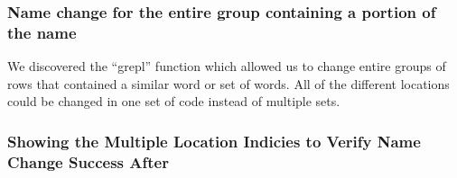 \documentclass[
]{article}
\newenvironment{Shaded}{\begin{snugshade}}{\end{snugshade}}
\newcommand{\CommentTok}[1]{\textcolor[rgb]{0.56,0.35,0.01}{\textit{#1}}}
\newcommand{\KeywordTok}[1]{\textcolor[rgb]{0.13,0.29,0.53}{\textbf{#1}}}
\newcommand{\NormalTok}[1]{#1}
\newcommand{\OperatorTok}[1]{\textcolor[rgb]{0.81,0.36,0.00}{\textbf{#1}}}
\newcommand{\StringTok}[1]{\textcolor[rgb]{0.31,0.60,0.02}{#1}}
\begin{document}
\begin{Shaded}
\end{Shaded}

\begin{Shaded}
\end{Shaded}

\begin{Shaded}
\end{Shaded}

\hypertarget{name-change-for-the-entire-group-containing-a-portion-of-the-name}{%
\subsubsection{Name change for the entire group containing a portion of
the
name}\label{name-change-for-the-entire-group-containing-a-portion-of-the-name}}

We discovered the ``grepl'' function which allowed us to change entire
groups of rows that contained a similar word or set of words. All of the
different locations could be changed in one set of code instead of
multiple sets.

\begin{Shaded}
\end{Shaded}

\hypertarget{showing-the-multiple-location-indicies-to-verify-name-change-success-after}{%
\subsubsection{Showing the Multiple Location Indicies to Verify Name
Change Success
After}\label{showing-the-multiple-location-indicies-to-verify-name-change-success-after}}
\end{document}

